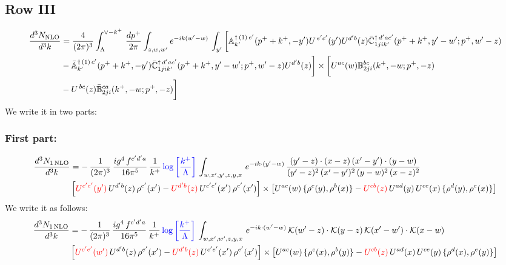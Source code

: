 \documentclass[9pt]{article}
\def\mf#1{\mathbb{#1}}
\newcommand{\chg}[1]{{\color{red}#1}}
\numberwithin{equation}{section}
\begin{document}
 \subsection{Row III}
 \begin{align}
    \frac{d^{3}N_{\rm NLO}}{d^{3}k} & =   \frac{4}{(2\pi)^{3}} \int_{\Lambda}^{\vee -k^{+}}\, \frac{dp^{+}}{2\pi}\int_{z,w,w^{\prime}} e^{-ik(w^{\prime}-w)}\,\int_{y^{\prime}}\bigg[\mf{A}^{\dagger\, (1)\,e^{\prime}}_{k^{\prime}}(p^{+}+k^{+},-y^{\prime})U^{\, e^{\prime}c^{\prime}}(y^{\prime})U^{d^{\prime}b}(z) \Bar{\mf{C}}^{\dagger\, d^{\prime}ac^{\prime}}_{1jik^{\prime}}(p^{+}+k^{+},y^{\prime}-w^{\prime}; p^{+},w^{\prime}-z)\notag \\ &  -\Bar{\mf{A}}^{\dagger\, (1)\,c^{\prime}}_{k^{\prime}}(p^{+}+k^{+},-y^{\prime}) \Bar{\mf{C}}^{\dagger\, d^{\prime}ac^{\prime}}_{1jik^{\prime}}(p^{+}+k^{+},y^{\prime}-w^{\prime}; p^{+},w^{\prime}-z)U^{d^{\prime}b}(z)\bigg] \times \bigg[U^{ac}(w) \mf{B}^{bc}_{2ji}(k^{+},-w;p^{+},-z)\notag \\ &  -U^{\, bc}(z)\Bar{\mf{B}}^{ca}_{2ji}(k^{+},-w; p^{+},-z)\bigg]\nonumber
\end{align}
We write it in two parts:
\subsubsection{First part:}
\begin{align}
     \frac{d^{3}N_{1\,\rm NLO}}{d^{3}k} & = -\,\frac{1}{(2\pi)^{3}}\, \frac{ig^{4}\,f^{c'd'a}}{16\pi^{5}}\, \frac{1}{k^{+}}\,{\color{blue}\log{\left[\frac{k^{+}}{\Lambda}\right]}}\, \int_{w,x',y',z,y,x}\, e^{-ik\cdot (y'-w)}\,\frac{(y'-z)\cdot (x-z)\,(x'-y')\cdot (y-w)}{(y'-z)^{2}\,(x'-y')^{2}\,(y-w)^{2}\,(x-z)^{2}}\notag \\ &  \left[\chg{U^{c'e'}(y')}\,U^{d'b}(z)\,\rho^{e'}(x')-\chg{U^{d'b}(z)}\,U^{c'e'}(x')\,\rho^{e'}(x')\right]\times  \left[U^{ac}(w)\, \{\rho^{c}(y),\rho^{b}(x)\}-\chg{U^{cb}(z)}\,U^{ad}(y)\,U^{ce}(x)\,\{\rho^{d}(y),\rho^{e}(x)\}\right]
\end{align} 
We write it as follows:
\begin{align}
     \frac{d^{3}N_{1\,\rm NLO}}{d^{3}k} & = -\,\frac{1}{(2\pi)^{3}}\, \frac{ig^{4}\,f^{c'd'a}}{16\pi^{5}}\, \frac{1}{k^{+}}\,{\color{blue}\log{\left[\frac{k^{+}}{\Lambda}\right]}}\, \int_{w,x',w',z,y,x}\, e^{-ik\cdot (w'-w)}\,\mathcal{K}(w'-z)\cdot \mathcal{K}(y-z)\,\mathcal{K}(x'-w')\cdot \mathcal{K}(x-w)\notag \\ &  \left[\chg{U^{c'e'}(w')}\,U^{d'b}(z)\,\rho^{e'}(x')-\chg{U^{d'b}(z)}\,U^{c'e'}(x')\,\rho^{e'}(x')\right]\times  \left[U^{ac}(w)\, \{\rho^{c}(x),\rho^{b}(y)\}-\chg{U^{cb}(z)}\,U^{ad}(x)\,U^{ce}(y)\,\{\rho^{d}(x),\rho^{e}(y)\}\right]
\end{align} 
\end{document}
